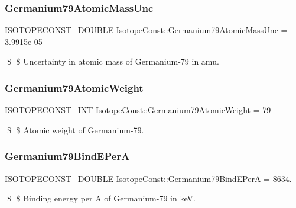 \subsubsection{\texorpdfstring{Germanium79\+Atomic\+Mass\+Unc}{Germanium79AtomicMassUnc}}
{\footnotesize\ttfamily \mbox{\hyperlink{group___isotope_const-_macros_ga8f45a7272ce02c0b4c65c44636ed719a}{I\+S\+O\+T\+O\+P\+E\+C\+O\+N\+S\+T\+\_\+\+D\+O\+U\+B\+LE}} Isotope\+Const\+::\+Germanium79\+Atomic\+Mass\+Unc = 3.\+9915e-\/05}

\$ \$ Uncertainty in atomic mass of Germanium-\/79 in amu. \mbox{\label{group___isotope_const-_germanium-_ge79_ga61e6b3088c676fc7c197458d8176caa9}} 
\subsubsection{\texorpdfstring{Germanium79\+Atomic\+Weight}{Germanium79AtomicWeight}}
{\footnotesize\ttfamily \mbox{\hyperlink{group___isotope_const-_macros_ga5f18360b3e99483a35c32d789e62621c}{I\+S\+O\+T\+O\+P\+E\+C\+O\+N\+S\+T\+\_\+\+I\+NT}} Isotope\+Const\+::\+Germanium79\+Atomic\+Weight = 79}

\$ \$ Atomic weight of Germanium-\/79. \mbox{\label{group___isotope_const-_germanium-_ge79_ga0169d8ae821f1d787f810e6d0a0e98ce}} 
\subsubsection{\texorpdfstring{Germanium79\+Bind\+E\+PerA}{Germanium79BindEPerA}}
{\footnotesize\ttfamily \mbox{\hyperlink{group___isotope_const-_macros_ga8f45a7272ce02c0b4c65c44636ed719a}{I\+S\+O\+T\+O\+P\+E\+C\+O\+N\+S\+T\+\_\+\+D\+O\+U\+B\+LE}} Isotope\+Const\+::\+Germanium79\+Bind\+E\+PerA = 8634.}

\$ \$ Binding energy per A of Germanium-\/79 in keV. \mbox{\label{group___isotope_const-_germanium-_ge79_ga2fd2b244e4cee665963d2a628d6c236e}} 
